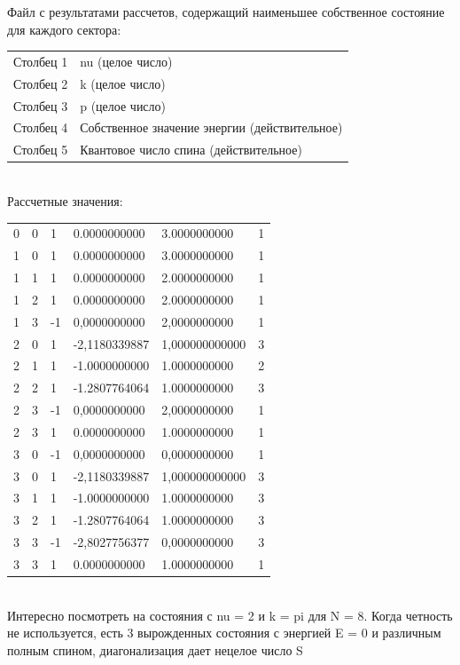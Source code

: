\documentclass[11pt]{article}
\begin{document}
Файл с результатами рассчетов, содержащий наименьшее собственное состояние для каждого сектора: \\

\begin{tabular}{ll}
Столбец 1 & nu (целое число) \\
Столбец 2 & k (целое число) \\
Столбец 3 & p (целое число) \\
Столбец 4 & Собственное значение энергии (действительное) \\
Столбец 5 & Квантовое число спина (действительное) \\
\end{tabular}\\

Рассчетные значения: \\

\begin{tabular}{llllll}
    0 & 0 & 1 & 0.0000000000 & 3.0000000000 & 1 \\
    1 & 0 & 1 & 0.0000000000 & 3.0000000000 & 1 \\
    1 & 1 & 1 & 0.0000000000 & 2.0000000000 & 1 \\
    1 & 2 & 1 & 0.0000000000 & 2.0000000000 & 1 \\
    1 & 3 & -1 & 0,0000000000 & 2,0000000000 & 1 \\
    2 & 0 & 1 & -2,1180339887 & 1,000000000000 & 3 \\
    2 & 1 & 1 & -1.0000000000 & 1.0000000000 & 2 \\
    2 & 2 & 1 & -1.2807764064 & 1.0000000000 & 3 \\
    2 & 3 & -1 & 0,0000000000 & 2,0000000000 & 1 \\
    2 & 3 & 1 & 0.0000000000 & 1.0000000000 & 1 \\
    3 & 0 & -1 & 0,0000000000 & 0,0000000000 & 1 \\
    3 & 0 & 1 & -2,1180339887 & 1,000000000000 & 3 \\
    3 & 1 & 1 &  -1.0000000000 & 1.0000000000 & 3 \\
    3 & 2 & 1 & -1.2807764064 & 1.0000000000 & 3 \\
    3 & 3 & -1 & -2,8027756377 & 0,0000000000 & 3 \\
    3 & 3 & 1 & 0.0000000000 & 1.0000000000 & 1 \\
\end{tabular}\\

Интересно посмотреть на состояния с nu = 2 и k = pi для N = 8. Когда четность не используется, есть 3 вырожденных состояния с энергией E = 0 и различным полным спином, диагонализация дает нецелое число S \\
\end{document}
